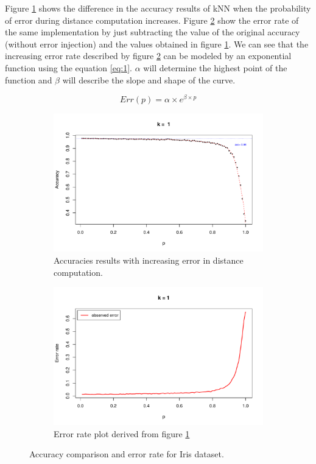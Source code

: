 \documentclass{article}
\begin{document}
Figure \ref{fig:a} shows the difference in the accuracy results of kNN when the probability of error during distance computation increases. Figure \ref{fig:b} show the error rate of the same implementation by just subtracting the value of the original accuracy (without error injection) and the values obtained in figure \ref{fig:a}.  We can see that the increasing error rate described by figure \ref{fig:b} can be modeled by an exponential function using the equation \ref{eq:1}. $\alpha$ will determine the highest point of the function and  $\beta$ will describe the slope and shape of the curve.

\begin{equation}\label{eq:1}
  Err(p) = \alpha \times e^{\beta \times p}
\end{equation}

\begin{figure}
\begin{subfigure}{0.48\textwidth}
\includegraphics[width=\linewidth]{figures/accuracies.pdf}
\caption{Accuracies results with increasing error in distance computation.} \label{fig:a}
\end{subfigure}
\hspace*{\fill} %
\begin{subfigure}{0.48\textwidth}
\includegraphics[width=\linewidth]{figures/errors.pdf}
\caption{Error rate plot derived from figure \ref{fig:a}} \label{fig:b}
\end{subfigure}
\caption{Accuracy comparison and error rate for Iris dataset.} \label{fig:accerr}
\end{figure}
\end{document}
